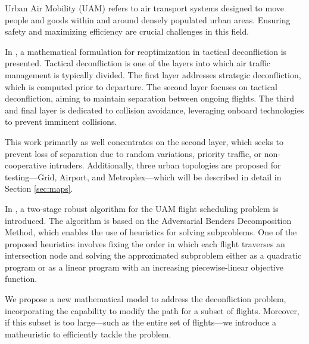 \documentclass[../../thesis.tex]{subfiles}
\begin{document}
Urban Air Mobility (UAM) refers to air transport systems designed to move people and goods within and around densely populated urban areas. Ensuring safety and maximizing efficiency are crucial challenges in this field.  

In \cite{pelegrin-2023}, a mathematical formulation for reoptimization in tactical deconfliction is presented. Tactical deconfliction is one of the layers into which air traffic management is typically divided. The first layer addresses strategic deconfliction, which is computed prior to departure. The second layer focuses on tactical deconfliction, aiming to maintain separation between ongoing flights. The third and final layer is dedicated to collision avoidance, leveraging onboard technologies to prevent imminent collisions.

This work primarily as well concentrates on the second layer, which seeks to prevent loss of separation due to random variations, priority traffic, or non-cooperative intruders. Additionally, three urban topologies are proposed for testing—Grid, Airport, and Metroplex—which will be described in detail in Section \ref{sec:maps}.  

In \cite{portoleau-2024}, a two-stage robust algorithm for the UAM flight scheduling problem is introduced. The algorithm is based on the Adversarial Benders Decomposition Method, which enables the use of heuristics for solving subproblems.
One of the proposed heuristics involves fixing the order in which each flight traverses an intersection node 
%
and solving the approximated subproblem either as a quadratic program or as a linear program with an increasing piecewise-linear objective function.  

We propose a new mathematical model to address the deconfliction problem, incorporating the capability to modify the path for a subset of flights. Moreover, if this subset is too large—such as the entire set of flights—we introduce a matheuristic to efficiently tackle the problem.  
\end{document}
